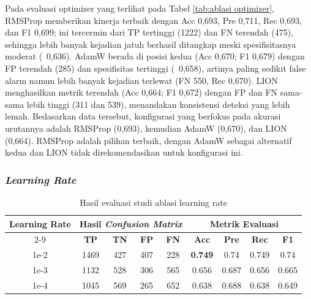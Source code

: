 Pada evaluasi optimizer yang terlihat pada Tabel \ref{tab:ablasi optimizer}, RMSProp memberikan kinerja terbaik dengan Acc 0,693, Pre 0,711, Rec 0,693, dan F1 0,699; ini tercermin dari TP tertinggi (1222) dan FN terendah (475), sehingga lebih banyak kejadian jatuh berhasil ditangkap meski spesifisitasnya moderat (~0,636). AdamW berada di posisi kedua (Acc 0,670; F1 0,679) dengan FP terendah (285) dan spesifisitas tertinggi (~0,658), artinya paling sedikit false alarm namun lebih banyak kejadian terlewat (FN 550, Rec 0,670). LION menghasilkan metrik terendah (Acc 0,664; F1 0,672) dengan FP dan FN sama-sama lebih tinggi (311 dan 539), menandakan konsistensi deteksi yang lebih lemah. Bedasarkan data tersebut, konfigurasi yang berfokus pada akurasi urutannya adalah RMSProp (0,693), kemudian AdamW (0,670), dan LION (0,664). RMSProp adalah pilihan terbaik, dengan AdamW sebagai alternatif kedua dan LION tidak direkomendasikan untuk konfigurasi ini.


\subsubsection{\textit{Learning Rate}} \label{IV.lr}

\begin{table}[htbp]
    \centering
    \caption{Hasil evaluasi studi ablasi learning rate}
    \label{tab:ablasi lr}
    \begin{tabular}{|c|c|c|c|c|c|c|c|c|}
        \hline
        \multirow{2}{*}{\textbf{Learning Rate}} & \multicolumn{4}{c|}{\textbf{Hasil \textit{Confusion Matrix}}} & \multicolumn{4}{c|}{\textbf{Metrik Evaluasi}} \\ \cline{2-9}
         & \textbf{TP} & \textbf{TN} & \textbf{FP} & \textbf{FN} & \textbf{Acc} & \textbf{Pre} & \textbf{Rec} & \textbf{F1} \\ \hline
        1e-2 & 1469 & 427 & 407 & 228 & \textbf{0.749} & 0.74 & 0.749 & 0.74 \\ \hline
        1e-3 & 1132  & 528 & 306 & 565 & 0.656 & 0.687 & 0.656 & 0.665 \\ \hline
        1e-4 & 1045 & 569 & 265 & 652 & 0.638 & 0.688 & 0.638 & 0.649 \\ \hline
    \end{tabular}
\end{table}

